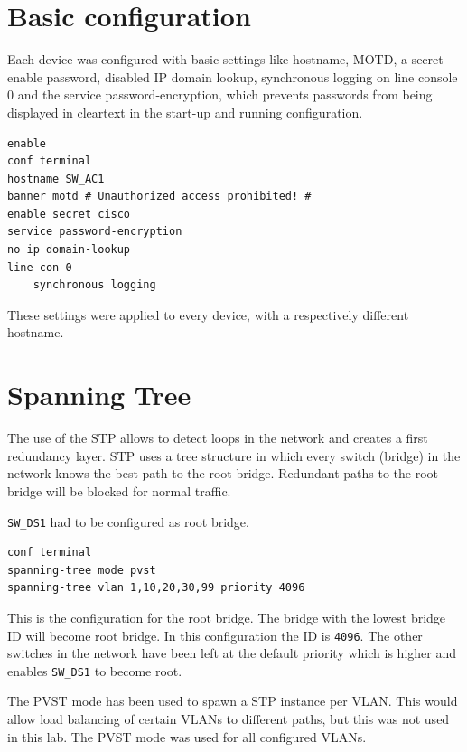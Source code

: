 \section{Basic configuration}

Each device was configured with basic settings like hostname, \ac{MOTD}, a secret enable password, disabled IP domain lookup, synchronous logging on line console 0 and the service password-encryption, which prevents passwords from being displayed in cleartext in the start-up and running configuration.

\begin{lstlisting}[caption={Basic configuration},label={lst:debug_s3},language={}]
enable
conf terminal
hostname SW_AC1
banner motd # Unauthorized access prohibited! #
enable secret cisco
service password-encryption
no ip domain-lookup
line con 0
	synchronous logging
\end{lstlisting}

These settings were applied to every device, with a respectively different hostname.

\section{Spanning Tree}

The use of the \ac{STP} allows to detect loops in the network and creates a first redundancy layer. \ac{STP} uses a tree structure in which every switch (bridge) in the network knows the best path to the root bridge. Redundant paths to the root bridge will be blocked for normal traffic.

\texttt{SW\_DS1} had to be configured as root bridge.

\begin{lstlisting}[caption={\ac{STP} configuration root},label={lst:stp},language={}]
conf terminal
spanning-tree mode pvst
spanning-tree vlan 1,10,20,30,99 priority 4096
\end{lstlisting}

This is the configuration for the root bridge. The bridge with the lowest bridge ID will become root bridge. In this configuration the ID is \texttt{4096}. The other switches in the network have been left at the default priority which is higher and enables \texttt{SW\_DS1} to become root.

The \ac{PVST} mode has been used to spawn a \ac{STP} instance per VLAN. This would allow load balancing of certain \acp{VLAN} to different paths, but this was not used in this lab. The \ac{PVST} mode was used for all configured \ac{VLAN}s.

